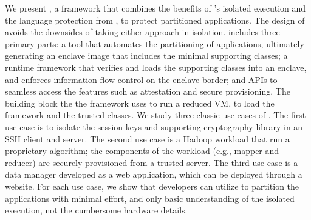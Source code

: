 \begin{compactitem}
\item
We present {\em \civet{}}, a framework that combines the benefits of
\sgx{}'s isolated execution and the language protection from \java{}, to protect partitioned applications.
The design of \civet{} avoids the downsides of taking either approach in isolation.
\civet{} includes three primary parts:
a tool that automates the partitioning of applications, ultimately generating an enclave image that includes
the minimal supporting classes;
a runtime framework that verifies and loads the supporting classes into an enclave, and enforces information flow control on the enclave border;
and \java{} APIs to seamless access the \sgx{} features such
as attestation and secure provisioning.
The building block the the \civet{} framework uses \graphenesgx{} to run a reduced \java{} VM, to load the framework and the trusted classes.
We study three classic use cases of \civet{}.
The first use case is to isolate the 
session keys and supporting cryptography library in an SSH client and server.
The second use case is a Hadoop workload that run a proprietary algorithm;
the components of the workload (e.g., mapper and reducer)
are securely provisioned from a trusted server.
The third use case is a data manager developed as a web application, which can be deployed through a website.
For each use case, we show that developers can utilize \civet{} to partition the applications with minimal effort,
and only basic understanding of the isolated execution,
not the cumbersome hardware details.  %

\end{compactitem}




